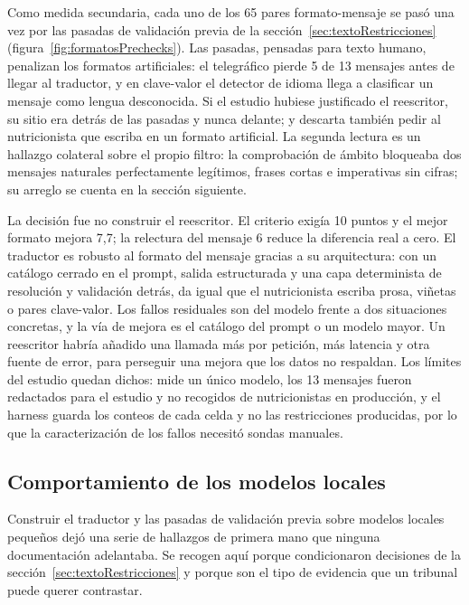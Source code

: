 Como medida secundaria, cada uno de los 65 pares formato-mensaje se pasó una vez por las pasadas de validación previa de la sección~\ref{sec:textoRestricciones} (figura~\ref{fig:formatosPrechecks}). Las pasadas, pensadas para texto humano, penalizan los formatos artificiales: el telegráfico pierde 5 de 13 mensajes antes de llegar al traductor, y en clave-valor el detector de idioma llega a clasificar un mensaje como lengua desconocida. Si el estudio hubiese justificado el reescritor, su sitio era detrás de las pasadas y nunca delante; y descarta también pedir al nutricionista que escriba en un formato artificial. La segunda lectura es un hallazgo colateral sobre el propio filtro: la comprobación de ámbito bloqueaba dos mensajes naturales perfectamente legítimos, frases cortas e imperativas sin cifras; su arreglo se cuenta en la sección siguiente.

La decisión fue no construir el reescritor. El criterio exigía 10 puntos y el mejor formato mejora 7,7; la relectura del mensaje 6 reduce la diferencia real a cero. El traductor es robusto al formato del mensaje gracias a su arquitectura: con un catálogo cerrado en el prompt, salida estructurada y una capa determinista de resolución y validación detrás, da igual que el nutricionista escriba prosa, viñetas o pares clave-valor. Los fallos residuales son del modelo frente a dos situaciones concretas, y la vía de mejora es el catálogo del prompt o un modelo mayor. Un reescritor habría añadido una llamada más por petición, más latencia y otra fuente de error, para perseguir una mejora que los datos no respaldan. Los límites del estudio quedan dichos: mide un único modelo, los 13 mensajes fueron redactados para el estudio y no recogidos de nutricionistas en producción, y el harness guarda los conteos de cada celda y no las restricciones producidas, por lo que la caracterización de los fallos necesitó sondas manuales.

\subsection{Comportamiento de los modelos locales}
\label{sec:evalModelosLocales}

Construir el traductor y las pasadas de validación previa sobre modelos locales pequeños dejó una serie de hallazgos de primera mano que ninguna documentación adelantaba. Se recogen aquí porque condicionaron decisiones de la sección~\ref{sec:textoRestricciones} y porque son el tipo de evidencia que un tribunal puede querer contrastar.

